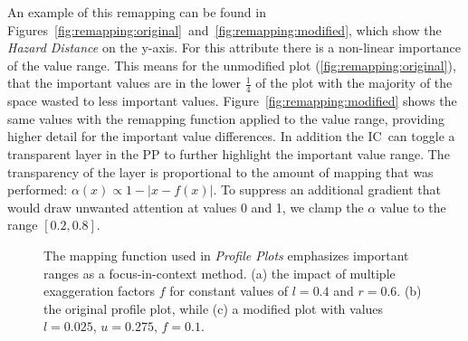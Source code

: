 \documentclass[conference,10pt,letter]{IEEEtran}
\def\IC{IC}
\begin{document}
An example of this remapping can be found in Figures~\ref{fig:remapping:original}~and~\ref{fig:remapping:modified}, which show the \emph{Hazard Distance} on the y-axis. For this attribute there is a non-linear importance of the value range. This means for the unmodified plot (\ref{fig:remapping:original}), that the important values are in the lower $\frac{1}{4}$ of the plot with the majority of the space wasted to less important values. Figure~\ref{fig:remapping:modified} shows the same values with the remapping function applied to the value range, providing higher detail for the important value differences. In addition the \IC\ can toggle a transparent layer in the PP to further highlight the important value range. The transparency of the layer is proportional to the amount of mapping that was performed: $\alpha(x) \propto 1 - \left| x - f(x) \right|$. To suppress an additional gradient that would draw unwanted attention at values 0 and 1, we clamp the $\alpha$ value to the range $[0.2,0.8]$.

\begin{figure}[b]
\vspace{-0.2cm}
\centering
{}
\hfill
{}
\hfill
{}
\caption{The mapping function used in \emph{Profile Plots} emphasizes important ranges as a focus-in-context method. (a) the impact of multiple exaggeration factors $f$ for constant values of $l=0.4$ and $r=0.6$. (b) the original profile plot, while (c) a modified plot with values $l=0.025$, $u=0.275$, $f=0.1$.}
\label{fig:remapping}
\end{figure}
\end{document}
